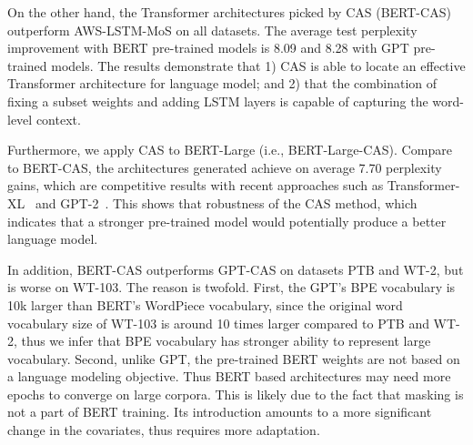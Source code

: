 \documentclass[11pt,a4paper]{article}
\begin{document}
On the other hand, the Transformer architectures picked by CAS (BERT-CAS)
outperform AWS-LSTM-MoS on all datasets. The average test perplexity
improvement with BERT pre-trained models is 8.09 and 8.28 with GPT
pre-trained models. The results demonstrate that 1) CAS is able to
locate an effective Transformer architecture for language model; and
2) that the combination of fixing a subset weights and adding LSTM
layers is capable of capturing the word-level context.


Furthermore, we apply CAS to BERT-Large (i.e., BERT-Large-CAS). Compare to BERT-CAS, the architectures generated achieve on average 7.70 perplexity gains, which are competitive results with recent approaches such as Transformer-XL~\cite{dai2019transformer} and GPT-2~\cite{radford2019language}. This shows that robustness of the CAS method, which indicates that a stronger pre-trained model would potentially produce a better language model.

In addition, BERT-CAS outperforms GPT-CAS on datasets PTB and WT-2, but is worse on WT-103. The reason is twofold. First, the GPT's BPE vocabulary is 10k larger than BERT's WordPiece vocabulary, since the original word vocabulary size of WT-103 is around 10 times larger compared to PTB and WT-2, thus we infer that BPE vocabulary has stronger ability to represent large vocabulary. Second, unlike GPT, the pre-trained BERT weights are not based on a language modeling objective. Thus BERT based architectures may need more epochs to converge on large corpora. This is likely due to the fact that masking is not a part of BERT training. Its introduction amounts to a more significant change in the covariates, thus requires more adaptation.
\end{document}
